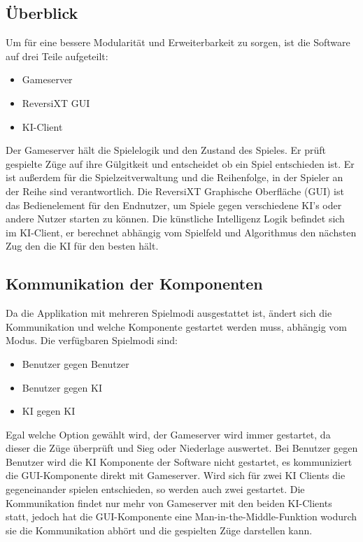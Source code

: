 \documentclass[12pt,a4paper,bibliography=totocnumbered,listof=totocnumbered]{article}
\begin{document}
\subsection{Überblick}
Um für eine bessere Modularität und Erweiterbarkeit zu sorgen, ist die Software auf drei Teile aufgeteilt:
\begin{itemize}
    \item Gameserver
    \item ReversiXT GUI
    \item KI-Client
\end{itemize}
Der Gameserver hält die Spielelogik und den Zustand des Spieles. Er prüft gespielte Züge auf ihre Gülgitkeit 
und entscheidet ob ein Spiel entschieden ist. Er ist außerdem für die Spielzeitverwaltung und die Reihenfolge, in 
der Spieler an der Reihe sind verantwortlich. Die ReversiXT Graphische Oberfläche (GUI) ist das Bedienelement für 
den Endnutzer, um Spiele gegen verschiedene KI's oder andere Nutzer starten zu können. 
Die künstliche Intelligenz Logik befindet sich im KI-Client, er berechnet abhängig vom Spielfeld und Algorithmus
den nächsten Zug den die KI für den besten hält.



\subsection{Kommunikation der Komponenten}
\label{chap:Ablauf}
Da die Applikation mit mehreren Spielmodi ausgestattet ist, ändert sich die Kommunikation und welche Komponente gestartet werden muss, abhängig vom Modus.
Die verfügbaren Spielmodi sind:
\begin{itemize}
    \item Benutzer gegen Benutzer
    \item Benutzer gegen KI
    \item KI gegen KI
\end{itemize}
Egal welche Option gewählt wird, der Gameserver wird immer gestartet, da dieser die Züge überprüft und Sieg oder Niederlage auswertet.
Bei Benutzer gegen Benutzer wird die KI Komponente der Software nicht gestartet, es kommuniziert die GUI-Komponente direkt mit Gameserver.
Wird sich für zwei KI Clients die gegeneinander spielen entschieden, so werden auch zwei gestartet.
Die Kommunikation findet nur mehr von Gameserver mit den beiden KI-Clients statt, jedoch hat die GUI-Komponente eine Man-in-the-Middle-Funktion
wodurch sie die Kommunikation abhört und die gespielten Züge darstellen kann.
\end{document}
